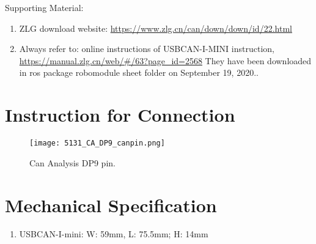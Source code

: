 Supporting Material:
\begin{enumerate}
	\item ZLG download website: \url{https://www.zlg.cn/can/down/down/id/22.html}
    \item Always refer to: online instructions of USBCAN-I-MINI instruction, \url{https://manual.zlg.cn/web/#/63?page_id=2568} 
      They have been downloaded in ros package robomodule sheet folder on {\color{red} September 19, 2020.}.
\end{enumerate}


\section{Instruction for Connection}

\begin{figure}[htb]
	\texttt{[image: 5131\_CA\_DP9\_canpin.png]}
	\caption[Can Analysis DP9 pin]{ 
		Can Analysis DP9 pin.		 
		}
\end{figure}


\section{Mechanical Specification}

\begin{enumerate}
	\item USBCAN-I-mini:  W: 59mm, L: 75.5mm; H: 14mm
\end{enumerate}

